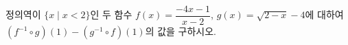 \hspace*{2mm}\begin{minipage}[t]{\dimexpr\linewidth-2mm\relax}\vspace{0pt}
정의역이 $\{x\mid x<2\}$인 두 함수 $f(x)=\dfrac{-4x-1}{x-2}$, $g(x)=\sqrt{2-x}-4$에 대하여 $(f^{-1}\circ g)(1)-(g^{-1}\circ f)(1)$의 값을 구하시오.\end{minipage}
